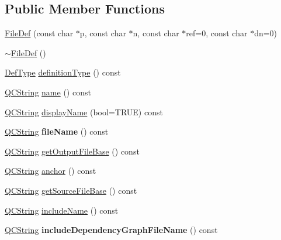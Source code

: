 \subsection*{Public Member Functions}
\begin{DoxyCompactItemize}
\item 
\mbox{\hyperlink{class_file_def_aa0f1d4c412599b7c03d214c939e1ca95}{File\+Def}} (const char $\ast$p, const char $\ast$n, const char $\ast$ref=0, const char $\ast$dn=0)
\item 
\mbox{\hyperlink{class_file_def_a5ed8a95230184de0f82d21bf08f4ac0a}{$\sim$\+File\+Def}} ()
\item 
\mbox{\hyperlink{class_definition_intf_ada60114bc621669dd8c19edfc6421766}{Def\+Type}} \mbox{\hyperlink{class_file_def_a91629ee75b5caf817a7338c02a12bd0a}{definition\+Type}} () const
\item 
\mbox{\hyperlink{class_q_c_string}{Q\+C\+String}} \mbox{\hyperlink{class_file_def_a68f9ae783659b8c3738623edfdb6ee74}{name}} () const
\item 
\mbox{\hyperlink{class_q_c_string}{Q\+C\+String}} \mbox{\hyperlink{class_file_def_ab5973477f072d780c9a184d16b58410b}{display\+Name}} (bool=T\+R\+UE) const
\item 
\mbox{\label{class_file_def_aaed54437148127ef872b77c088cf3e3e}} 
\mbox{\hyperlink{class_q_c_string}{Q\+C\+String}} {\bfseries file\+Name} () const
\item 
\mbox{\hyperlink{class_q_c_string}{Q\+C\+String}} \mbox{\hyperlink{class_file_def_a57496c4b5436110bd66fdfa1fee0eefe}{get\+Output\+File\+Base}} () const
\item 
\mbox{\hyperlink{class_q_c_string}{Q\+C\+String}} \mbox{\hyperlink{class_file_def_a793b9b4a7196fd94226d4fab0a27a12d}{anchor}} () const
\item 
\mbox{\hyperlink{class_q_c_string}{Q\+C\+String}} \mbox{\hyperlink{class_file_def_a9ddb22ec1cbae4e2b8d192c455103046}{get\+Source\+File\+Base}} () const
\item 
\mbox{\hyperlink{class_q_c_string}{Q\+C\+String}} \mbox{\hyperlink{class_file_def_a2520150a3fdcd1fc4ed3cefa31d146f5}{include\+Name}} () const
\item 
\mbox{\label{class_file_def_afeae6d213fc1eb011e16f8e080570e92}} 
\mbox{\hyperlink{class_q_c_string}{Q\+C\+String}} {\bfseries include\+Dependency\+Graph\+File\+Name} () const
\item 
\mbox{\label{class_file_def_a647a32b7ec482991424af3b9deff0f45}} 

\end{DoxyCompactItemize}
